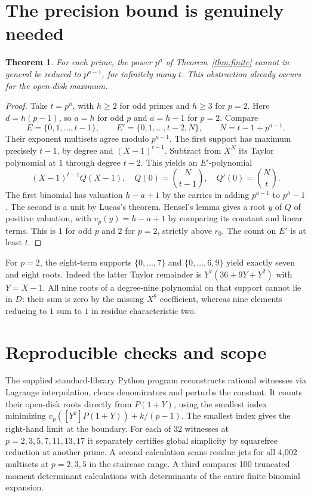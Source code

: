 \documentclass[11pt,letterpaper]{article}
\newtheorem{theorem}{Theorem}
\newcommand{\ord}{v_p}\newcommand{\ds}{s_p}
\begin{document}
\section{The precision bound is genuinely needed}
\begin{theorem}\label{thm:optimal}
For each prime, the power $p^a$ of Theorem~\ref{thm:finite} cannot in general be reduced to $p^{a-1}$, for infinitely many $t$. This obstruction already occurs for the open-disk maximum.
\end{theorem}
\begin{proof}
Take $t=p^h$, with $h\ge2$ for odd primes and $h\ge3$ for $p=2$. Here $d=h(p-1)$, so $a=h$ for odd $p$ and $a=h-1$ for $p=2$. Compare
\[
 E=\{0,1,\ldots,t-1\},\qquad
 E'=\{0,1,\ldots,t-2,N\},\qquad N=t-1+p^{a-1}.
\]
Their exponent multisets agree modulo $p^{a-1}$. The first support has maximum precisely $t-1$, by degree and $(X-1)^{t-1}$. Subtract from $X^N$ its Taylor polynomial at $1$ through degree $t-2$. This yields an $E'$-polynomial
\[
 (X-1)^{t-1}Q(X-1),\quad
 Q(0)=\binom N{t-1},\quad Q'(0)=\binom Nt .
\]
The first binomial has valuation $h-a+1$ by the carries in adding $p^{a-1}$ to $p^h-1$. The second is a unit by Lucas's theorem. Hensel's lemma gives a root $y$ of $Q$ of positive valuation, with $\ord(y)=h-a+1$ by comparing its constant and linear terms. This is $1$ for odd $p$ and $2$ for $p=2$, strictly above $r_0$. The count on $E'$ is at least $t$.
\end{proof}

For $p=2$, the eight-term supports $\{0,\ldots,7\}$ and $\{0,\ldots,6,9\}$ yield exactly seven and eight roots. Indeed the latter Taylor remainder is $Y^7(36+9Y+Y^2)$ with $Y=X-1$. All nine roots of a degree-nine polynomial on that support cannot lie in $D$: their sum is zero by the missing $X^8$ coefficient, whereas nine elements reducing to $1$ sum to $1$ in residue characteristic two.

\section{Reproducible checks and scope}
The supplied standard-library Python program reconstructs rational witnesses via Lagrange interpolation, clears denominators and perturbs the constant. It counts their open-disk roots directly from $P(1+Y)$, using the smallest index minimizing $\ord([Y^k]P(1+Y))+k/(p-1)$. The smallest index gives the right-hand limit at the boundary. For each of 32 witnesses at $p=2,3,5,7,11,13,17$ it separately certifies global simplicity by squarefree reduction at another prime. A second calculation scans residue jets for all 4,002 multisets at $p=2,3,5$ in the staircase range. A third compares 100 truncated moment determinant calculations with determinants of the entire finite binomial expansion.
\end{document}
